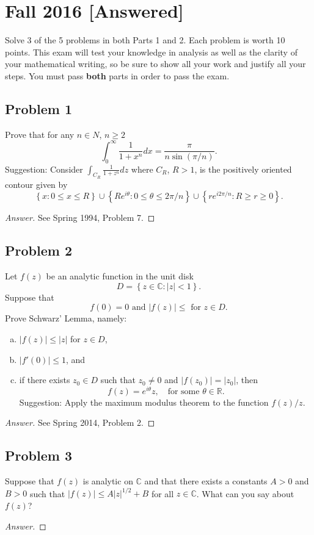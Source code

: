 \documentclass[12pt]{article}
\newcommand{\cx}{\mathbb{C}}
\newcommand{\real}{\mathbb{R}}
\newcommand\paren[1]{\left( #1 \right)}
\newcommand\setb[1]{\left \{ #1 \right \}}
\newcommand{\abs}[1]{\left| #1 \right|}
\theoremstyle{definition}
\begin{document}
\section{Fall 2016 [Answered]}
Solve 3 of the 5 problems in both Parts 1 and 2. Each problem is worth 10 points. This exam will test your knowledge in analysis as well as the clarity of your mathematical writing, so be sure to show all your work and justify all your steps. You must pass \textbf{both} parts in order to pass the exam. 

\subsection{Problem 1}
Prove that for any $n \in N$, $n \geq 2$
\[
    \int_0^{\infty} \frac{1}{1 + x^n} dx = \frac{\pi}{n \sin(\pi/n)} . 
\]
Suggestion: Consider $\int_{C_R} \frac{1}{1 + z^n}dz$ where $C_R$, $R > 1$, is the positively oriented contour given by 
\[
    \setb{x : 0 \leq x \leq R} \cup \setb{ Re^{i\theta} : 0 \leq \theta \leq 2\pi / n } \cup \setb{ re^{i2\pi/n} : R \geq r \geq 0  }. 
\]
\begin{proof}[Answer]
    See Spring 1994, Problem 7. 
\end{proof}

\subsection{Problem 2}
Let $f(z)$ be an analytic function in the unit disk 
\[
    D = \setb{ z \in \cx : \abs{z} < 1 } . 
\]
Suppose that 
\[
    f(0) = 0 \text{ and } \abs{ f(z) } \leq \text{ for } z \in D . 
\]
Prove Schwarz' Lemma, namely: 
\begin{enumerate}[(a)]
    \item $\abs{ f(z) } \leq \abs{ z }$ for $z \in D$, 
    \item $\abs{ f'(0) } \leq 1$, and 
    \item if there exists $z_0 \in D$ such that $z_0 \neq 0$ and $\abs{ f \paren{ z_0 } } = \abs{ z_0 }$, then 
    \[
        f(z) = e^{i\theta} z , \quad \text{for some } \theta \in \real . 
    \]
    Suggestion: Apply the maximum modulus theorem to the function $f(z) / z$.
\end{enumerate}
\begin{proof}[Answer]
    See Spring 2014, Problem 2. 
\end{proof}

\subsection{Problem 3}
Suppose that $f(z)$ is analytic on $\cx$ and that there exists a constants $A > 0$ and $B > 0$ such that $\abs{ f(z) } \leq A \abs{z}^{1/2} + B$ for all $z \in \cx$. What can you say about $f(z)$?
\begin{proof}[Answer]
    
\end{proof}
\end{document}
